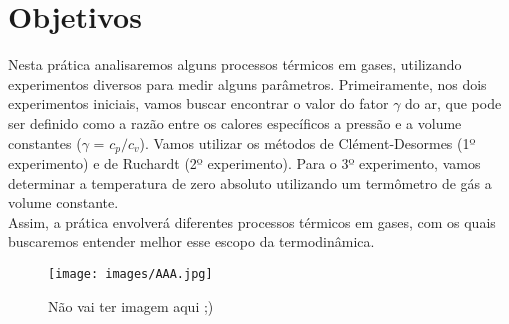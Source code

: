 \newpage
\section{Objetivos}

Nesta prática analisaremos alguns processos térmicos em gases, utilizando experimentos diversos para medir alguns parâmetros. Primeiramente, nos dois experimentos iniciais, vamos buscar encontrar o valor do fator $\gamma$ do ar, que pode ser definido como a razão entre os calores específicos a pressão e a volume constantes ($\gamma$ = $c_p/c_v$). Vamos utilizar os métodos de Clément-Desormes (1º experimento) e de Ruchardt (2º experimento). Para o 3º experimento, vamos determinar a temperatura de zero absoluto utilizando um termômetro de gás a volume constante.\\

Assim, a prática envolverá diferentes processos térmicos em gases, com os quais buscaremos entender melhor esse escopo da termodinâmica.\\


\begin{figure}[H]
  \centering
  \texttt{[image: images/AAA.jpg]}
  \caption{Não vai ter imagem aqui ;)}
\end{figure}

